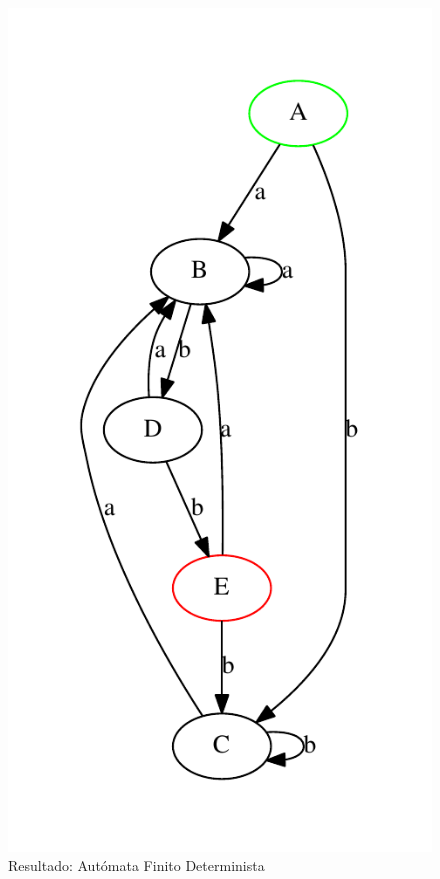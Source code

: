 \documentclass[a4paper,12pt]{article}
\begin{document}
\begin{figure}[h]
 \centering
 \includegraphics[scale = 0.5]{resultado.pdf}
 \caption{Resultado: Autómata Finito Determinista}
\end{figure}
\end{document}
